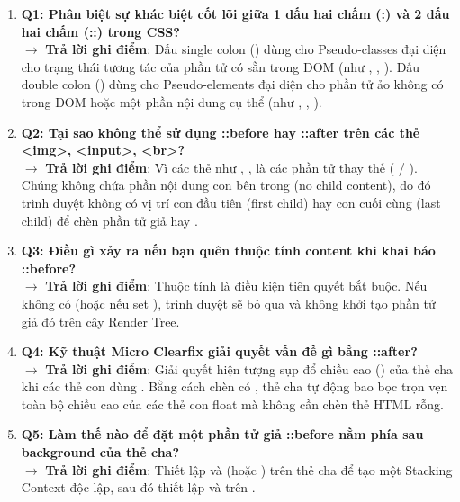 \begin{tipBox}
\begin{enumerate}[leftmargin=1.5em, itemsep=4pt, parsep=0pt]
    \item \textbf{Q1: Phân biệt sự khác biệt cốt lõi giữa 1 dấu hai chấm (:) và 2 dấu hai chấm (::) trong CSS?} \\
    $\rightarrow$ \textbf{Trả lời ghi điểm}: Dấu single colon (\codeinline{:}) dùng cho Pseudo-classes đại diện cho trạng thái tương tác của phần tử có sẵn trong DOM (như , , ). Dấu double colon (\codeinline{::}) dùng cho Pseudo-elements đại diện cho phần tử ảo không có trong DOM hoặc một phần nội dung cụ thể (như , , ).
    \item \textbf{Q2: Tại sao không thể sử dụng ::before hay ::after trên các thẻ <img>, <input>, <br>?} \\
    $\rightarrow$ \textbf{Trả lời ghi điểm}: Vì các thẻ như , ,  là các phần tử thay thế ( / ). Chúng không chứa phần nội dung con bên trong (no child content), do đó trình duyệt không có vị trí con đầu tiên (first child) hay con cuối cùng (last child) để chèn phần tử giả  hay .
    \item \textbf{Q3: Điều gì xảy ra nếu bạn quên thuộc tính content khi khai báo ::before?} \\
    $\rightarrow$ \textbf{Trả lời ghi điểm}: Thuộc tính  là điều kiện tiên quyết bắt buộc. Nếu không có  (hoặc nếu set ), trình duyệt sẽ bỏ qua và không khởi tạo phần tử giả đó trên cây Render Tree.
    \item \textbf{Q4: Kỹ thuật Micro Clearfix giải quyết vấn đề gì bằng ::after?} \\
    $\rightarrow$ \textbf{Trả lời ghi điểm}: Giải quyết hiện tượng sụp đổ chiều cao () của thẻ cha khi các thẻ con dùng . Bằng cách chèn  có , thẻ cha tự động bao bọc trọn vẹn toàn bộ chiều cao của các thẻ con float mà không cần chèn thẻ HTML rỗng.
    \item \textbf{Q5: Làm thế nào để đặt một phần tử giả ::before nằm phía sau background của thẻ cha?} \\
    $\rightarrow$ \textbf{Trả lời ghi điểm}: Thiết lập  và  (hoặc ) trên thẻ cha để tạo một Stacking Context độc lập, sau đó thiết lập  và  trên .
\end{enumerate}
\end{tipBox}

